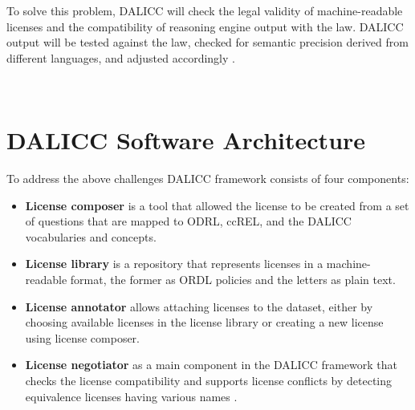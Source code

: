 \begin{itemize}
To solve this problem, DALICC will check the legal validity of machine-readable licenses and the compatibility of reasoning engine output with the law. DALICC output will be tested against the law, checked for semantic precision derived from different languages, and adjusted accordingly \cite{Anna}.
	
\end{itemize}
\\
\section{DALICC Software Architecture}
To address the above challenges DALICC framework consists of four components:\\
\begin{itemize}
	\item \textbf{License composer} is a tool that allowed the license to be created from a set of questions that are mapped to ODRL, ccREL, and the DALICC vocabularies and concepts.
	\item \textbf{License library} is a repository that represents licenses in a machine-readable format, the former as ORDL policies and the letters as plain text.
	\item \textbf{License annotator} allows attaching licenses to the dataset, either by choosing available licenses in the license library or creating a new license using license composer.
	\item \textbf{License negotiator} as a main component in the DALICC framework that checks the license compatibility and supports license conflicts by detecting equivalence licenses having various names \cite{Anna}.
\end{itemize}
